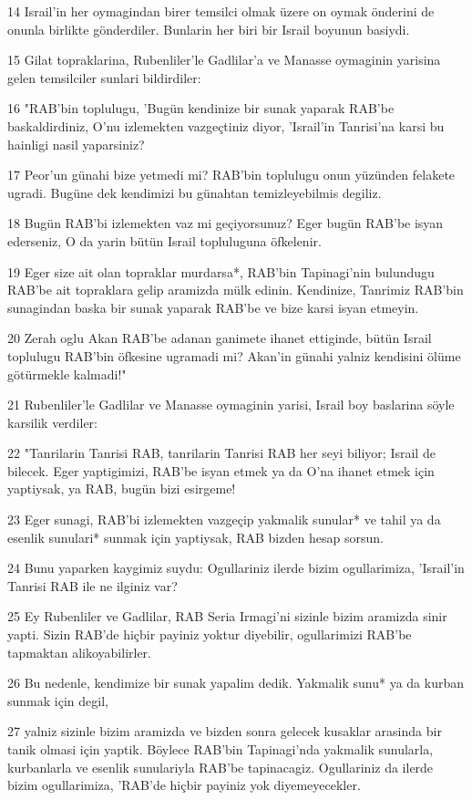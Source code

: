 \par 14 Israil'in her oymagindan birer temsilci olmak üzere on oymak önderini de onunla birlikte gönderdiler. Bunlarin her biri bir Israil boyunun basiydi.
\par 15 Gilat topraklarina, Rubenliler'le Gadlilar'a ve Manasse oymaginin yarisina gelen temsilciler sunlari bildirdiler:
\par 16 "RAB'bin toplulugu, 'Bugün kendinize bir sunak yaparak RAB'be baskaldirdiniz, O'nu izlemekten vazgeçtiniz diyor, 'Israil'in Tanrisi'na karsi bu hainligi nasil yaparsiniz?
\par 17 Peor'un günahi bize yetmedi mi? RAB'bin toplulugu onun yüzünden felakete ugradi. Bugüne dek kendimizi bu günahtan temizleyebilmis degiliz.
\par 18 Bugün RAB'bi izlemekten vaz mi geçiyorsunuz? Eger bugün RAB'be isyan ederseniz, O da yarin bütün Israil topluluguna öfkelenir.
\par 19 Eger size ait olan topraklar murdarsa*, RAB'bin Tapinagi'nin bulundugu RAB'be ait topraklara gelip aramizda mülk edinin. Kendinize, Tanrimiz RAB'bin sunagindan baska bir sunak yaparak RAB'be ve bize karsi isyan etmeyin.
\par 20 Zerah oglu Akan RAB'be adanan ganimete ihanet ettiginde, bütün Israil toplulugu RAB'bin öfkesine ugramadi mi? Akan'in günahi yalniz kendisini ölüme götürmekle kalmadi!"
\par 21 Rubenliler'le Gadlilar ve Manasse oymaginin yarisi, Israil boy baslarina söyle karsilik verdiler:
\par 22 "Tanrilarin Tanrisi RAB, tanrilarin Tanrisi RAB her seyi biliyor; Israil de bilecek. Eger yaptigimizi, RAB'be isyan etmek ya da O'na ihanet etmek için yaptiysak, ya RAB, bugün bizi esirgeme!
\par 23 Eger sunagi, RAB'bi izlemekten vazgeçip yakmalik sunular* ve tahil ya da esenlik sunulari* sunmak için yaptiysak, RAB bizden hesap sorsun.
\par 24 Bunu yaparken kaygimiz suydu: Ogullariniz ilerde bizim ogullarimiza, 'Israil'in Tanrisi RAB ile ne ilginiz var?
\par 25 Ey Rubenliler ve Gadlilar, RAB Seria Irmagi'ni sizinle bizim aramizda sinir yapti. Sizin RAB'de hiçbir payiniz yoktur diyebilir, ogullarimizi RAB'be tapmaktan alikoyabilirler.
\par 26 Bu nedenle, kendimize bir sunak yapalim dedik. Yakmalik sunu* ya da kurban sunmak için degil,
\par 27 yalniz sizinle bizim aramizda ve bizden sonra gelecek kusaklar arasinda bir tanik olmasi için yaptik. Böylece RAB'bin Tapinagi'nda yakmalik sunularla, kurbanlarla ve esenlik sunulariyla RAB'be tapinacagiz. Ogullariniz da ilerde bizim ogullarimiza, 'RAB'de hiçbir payiniz yok diyemeyecekler.
